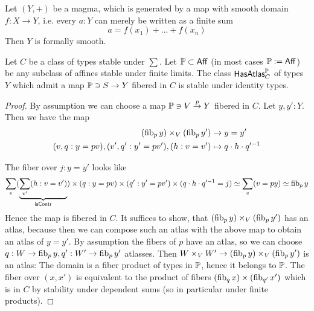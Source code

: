 \documentclass{article}
\newcommand{\Aff}{\mathsf{Aff}}
\begin{document}
\begin{corollary}{\label{lemma:SmoothMonoid}}
	Let $(Y , +)$ be a magma, which is generated by a map with smooth domain $f : X \to Y$, i.e. every $a : Y$ can merely be written as a finite sum \[
a = f(x_1) + \hdots + f(x_n)
\]
Then $Y$ is formally smooth.
\end{corollary}
\begin{lemma}{\label{lemma:havingAbstractAtlasClosedUnderId}}
	Let $C$ be a class of types stable under $\sum$. Let $\bP \subset \Aff$ (in most cases $\bP := \Aff$) be any subclass of affines stable under finite limits.  %
	The class $\mathsf{HasAtlas}_C^{\mathbb{P}}$ of types $Y$ which admit a map $\mathbb{P} \ni S \to Y$ fibered in $C$ is stable under identity types. \\
	
\end{lemma}
\begin{proof}
	
	By assumption we can choose a map $\mathbb{P} \ni V \overset{p}{\to} Y$ fibered in $C$. Let $y,y' : Y$.  Then we have the map
	\begin{align*}
		(\operatorname{fib}_p y) \times_V (\operatorname{fib}_p y') &\to y = y' \\
		(v , q : y = p v) , (v', q' : y' = p v') , (h : v = v') &\mapsto q \cdot h \cdot q'^{-1}
	\end{align*}
	
	The fiber over $j : y = y'$ looks like  %
	\[
	\sum_{v}  ( \underbrace{\sum_{v'} (h : v = v')}_{\mathsf{isContr}}) \times (q : y = p v) \times (q'  : y' = p v') \times (q \cdot h \cdot q'^{-1} = j) \simeq \sum_v (v = py) \simeq \operatorname{fib}_p y
	\]
	Hence the map is fibered in $C$. It suffices to show, that	$(\operatorname{fib}_p y) \times_V (\operatorname{fib}_p y')$ has an atlas, because then we can compose such an atlas with the above map to obtain an atlas of $y = y'$.
	By assumption the fibers of $p$ have an atlas, so we can choose $q : W \to \operatorname{fib}_p y, q' : W' \to \operatorname{fib}_p y'$ atlasses. Then $W \times_V W' \to (\operatorname{fib}_p y) \times_V (\operatorname{fib}_p y')$ is an atlas: The domain is a fiber product of types in $\mathbb{P}$, hence it belongs to $\mathbb{P}$. The fiber over $(x,x')$ is equivalent to the product of fibers $(\operatorname{fib}_q x) \times (\operatorname{fib}_{q'} x')$ which is in $C$ by stability under dependent sums (so in particular under finite products).
	
\end{proof}
\end{document}
